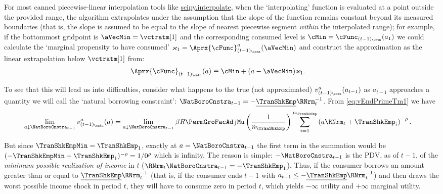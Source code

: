 For most canned piecewise-linear interpolation tools like \href{https://docs.scipy.org/doc/scipy/tutorial/interpolate.html}{scipy.interpolate}, when the `interpolating' function is evaluated at a point outside the provided range, the algorithm extrapolates under the assumption that the slope of the function remains constant beyond its measured boundaries (that is, the slope is assumed to be equal to the slope of nearest piecewise segment \emph{within} the interpolated range); for example, if the bottommost gridpoint is $\aVecMin = \vctratm[1]$ and the corresponding consumed level is $\cMin = \cFunc_{(t-1)_\cntn}(a_1)$ we could calculate the `marginal propensity to have consumed' $\varkappa_{1}=
\Aprx{\cFunc}_{(t-1)_\cntn}^{a}(\aVecMin)$ and construct the approximation as the linear extrapolation below $\vctratm[1]$ from:
\begin{equation}\begin{gathered}\begin{aligned}
      \Aprx{\cFunc}_{(t-1)_\cntn}(a)  &  \equiv \cMin + (a-\aVecMin)\varkappa_{1}  \label{eq:ExtrapLin}.
    \end{aligned}\end{gathered}\end{equation}

To see that this will lead us into difficulties, consider what happens to the true (not approximated) $v^{a}_{(t-1)_\cntn}(a_{t-1})$ as $a_{t-1}$ approaches a quantity we will call the `natural borrowing constraint': $\NatBoroCnstra_{t-1}=-\underline{\TranShkEmp}\RNrm_{t}^{-1}$.  From
\eqref{eq:vEndPrimeTm1} we have
\begin{equation}\begin{gathered}\begin{aligned}
      \lim_{a \downarrow \NatBoroCnstra_{t-1}} v^{a}_{(t-1)_\cntn}(a)
      & =                                                                                         \lim_{a \downarrow \NatBoroCnstra_{t-1}} \beta R \PermGroFacAdjMu \left(\frac{1}{n_{\TranShkEmp}}\right) \sum_{i=1}^{n_{\TranShkEmp}} \left( a \RNrm_{t}+ \TranShkEmp_{i}\right)^{-\rho}.
    \end{aligned}\end{gathered}\end{equation}

But since $\TranShkEmpMin=\TranShkEmp_{1}$, exactly at $a=\NatBoroCnstra_{t-1}$ the first term in the summation would be $(-\TranShkEmpMin+\TranShkEmp_{1})^{-\rho}=1/0^{\rho}$ which is infinity.  The reason is simple: $-\NatBoroCnstra_{t-1}$ is the PDV, as of $t-1$, of the \emph{minimum possible realization of income} in $t$ ($\RNrm_{t}\NatBoroCnstra_{t-1} = -\TranShkEmp_{1}$).  Thus, if the consumer borrows an amount greater than or equal to $\underline{\TranShkEmp}\RNrm_{t}^{-1}$ (that is, if the consumer ends $t-1$ with $a_{t-1} \leq -\underline{\TranShkEmp}\RNrm_{t}^{-1}$) and then draws the worst possible income shock in period $t$, they will have to consume zero in period $t$, which yields $-\infty$ utility and $+\infty$ marginal utility.


